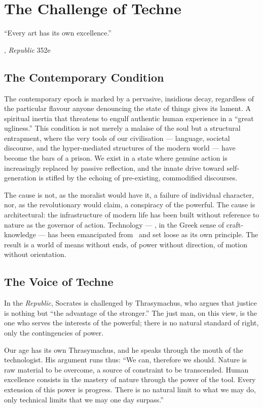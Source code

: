 \chapter{The Challenge of Techne}

\epigraph{``Every art has its own excellence.''}{\textcite{plato1997complete}, \emph{Republic} 352e}

\section{The Contemporary Condition}

The contemporary epoch is marked by a pervasive, insidious decay, regardless of
the particular flavour anyone denouncing the state of things gives its lament.
A spiritual inertia that threatens to engulf authentic human experience in a
``great ugliness.'' This condition is not merely a malaise of the soul but a
structural entrapment, where the very tools of our civilisation --- language,
societal discourse, and the hyper-mediated structures of the modern world ---
have become the bars of a prison. We exist in a state where genuine action is
increasingly replaced by passive reflection, and the innate drive toward
self-generation is stifled by the echoing of pre-existing, commodified
discourses.

The cause is not, as the moralist would have it, a failure of individual
character, nor, as the revolutionary would claim, a conspiracy of the powerful.
The cause is architectural: the infrastructure of modern life has been built
without reference to nature as the governor of action. Technology --- \techne,
in the Greek sense of craft-knowledge --- has been emancipated from \physis\ and
set loose as its own principle. The result is a world of means without ends, of
power without direction, of motion without orientation.

\section{The Voice of Techne}

In the \emph{Republic}, Socrates is challenged by Thrasymachus, who argues that
justice is nothing but ``the advantage of the stronger.'' The just man, on this
view, is the one who serves the interests of the powerful; there is no natural
standard of right, only the contingencies of power.

Our age has its own Thrasymachus, and he speaks through the mouth of the
technologist. His argument runs thus: ``We can, therefore we should. Nature is
raw material to be overcome, a source of constraint to be transcended. Human
excellence consists in the mastery of nature through the power of the tool.
Every extension of this power is progress. There is no natural limit to what we
may do, only technical limits that we may one day surpass.''

